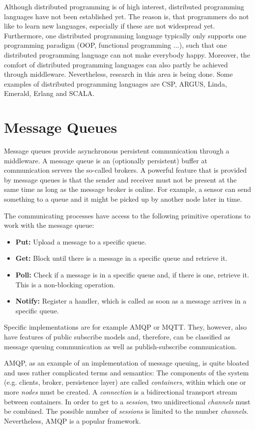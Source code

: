Although distributed programming is of high interest, distributed programming languages have not been established yet. The reason is, that programmers do not like to learn new languages, especially if these are not widespread yet. Furthermore, one distributed programming language typically only supports one programming paradigm (OOP, functional programming ...), such that one distributed programming language can not make everybody happy. Moreover, the comfort of distributed programming languages can also partly be achieved through middleware. Nevertheless, research in this area is being done. Some examples of distributed programming languages are CSP, ARGUS, Linda, Emerald, Erlang and SCALA.

\section{Message Queues}

Message queues provide asynchronous persistent communication through a middleware. A message queue is an (optionally persistent) buffer at communication servers \textendash{} the so-called brokers. A powerful feature that is provided by message queues is that the sender and receiver must not be present at the same time as long as the message broker is online. For example, a sensor can send something to a queue and it might be picked up by another node later in time.

The communicating processes have access to the following primitive operations to work with the message queue:

\begin{itemize}
    \item \textbf{Put:} Upload a message to a specific queue.
    \item \textbf{Get:} Block until there is a message in a specific queue and retrieve it.
    \item \textbf{Poll:} Check if a message is in a specific queue and, if there is one, retrieve it. This is a non-blocking operation.
    \item \textbf{Notify:} Register a handler, which is called as soon as a message arrives in a specific queue.
\end{itemize}

Specific implementations are for example \ac{AMQP} or MQTT. They, however, also have features of public subscribe models and, therefore, can be classified as message queuing communication as well as publish-subscribe communication.

\ac{AMQP}, as an example of an implementation of message queuing, is quite bloated and uses rather complicated terms and semantics: The components of the system (e.g. clients, broker, persistence layer) are called \textit{containers}, within which one or more \textit{nodes} must be created. A \textit{connection} is a bidirectional transport stream between containers. In order to get to a \textit{session}, two unidirectional \textit{channels} must be combined. The possible number of \textit{sessions} is limited to the number \textit{channels}. Nevertheless, \ac{AMQP} is a popular framework.